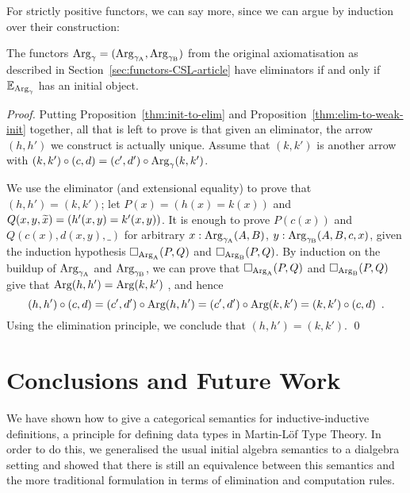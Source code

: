 \documentclass[orivec,envcountsame, ,envcountsect]{llncs}
\begin{document}
For strictly positive functors, we can say more, since we can argue by
induction over their construction:

\label{sec:elim-init-equiv-CSL}
\begin{theorem}
\label{thm:equiv-init-elim}
The functors $\text{Arg}_{\gamma} = (\text{Arg}_{\gamma_\text{A}}, \text{Arg}_{\gamma_\text{B}})$ from the original axiomatisation as
described in Section~\ref{sec:functors-CSL-article} have eliminators
if and only if $\mathbb{E}_{\text{Arg}_{\gamma}}$ has an initial object.
\end{theorem}
\begin{proof}
  Putting Proposition~\ref{thm:init-to-elim} and
  Proposition~\ref{thm:elim-to-weak-init} together, all that is left
  to prove is that given an eliminator, the arrow $(h, h')$ we
  construct is actually unique. Assume that $(k, k')$ is another arrow
  with $(k, k') \circ (c, d) = (c', d') \circ \text{Arg}_{\gamma}(k, k')$.

  We use the eliminator (and extensional equality) to prove that $(h, h') =
  (k ,k')$; let $P(x) = (h(x) = k(x))$ and $Q(x, y, \widetilde{x})
  = (h'(x, y) = k'(x, y))$. It is enough to prove $P(c(x))$ and
  $Q(c(x), d(x, y), \_)$ for arbitrary $x : \text{Arg}_{\gamma_\text{A}}(A, B)$, $y :
  \text{Arg}_{\gamma_\text{B}}(A, B, c, x)$, given the induction hypothesis $\Box_{\text{Arg}_{\text{A}}}(P,
  Q)$ and $\Box_{\text{Arg}_{\text{B}}}(P, Q)$.
By induction on the buildup of $\text{Arg}_{\gamma_\text{A}}$ and $\text{Arg}_{\gamma_\text{B}}$, we can prove that 
$\Box_{\text{Arg}_{\text{A}}}(P,  Q)$ and $\Box_{\text{Arg}_{\text{B}}}(P, Q)$ give that
$\text{Arg}(h, h') =  \text{Arg}(k, k')$ , and hence
  \[
  (h, h') \circ (c, d) = (c', d') \circ \text{Arg}(h, h')
                       = (c', d') \circ \text{Arg}(k, k')
                       = (k, k') \circ (c, d) \enspace .
  \]
  Using the elimination principle, we conclude that $(h, h') =  (k ,k')$. \qed
\end{proof}
\section{Conclusions and Future Work}

We have shown how to give a categorical semantics for
inductive-inductive definitions, a principle for defining data types in
Martin-L\"of Type Theory. In order to do this, we generalised the
usual initial algebra semantics to a dialgebra setting and showed that
there is still an equivalence between this semantics and the more
traditional formulation in terms of elimination and computation rules.
\end{document}
